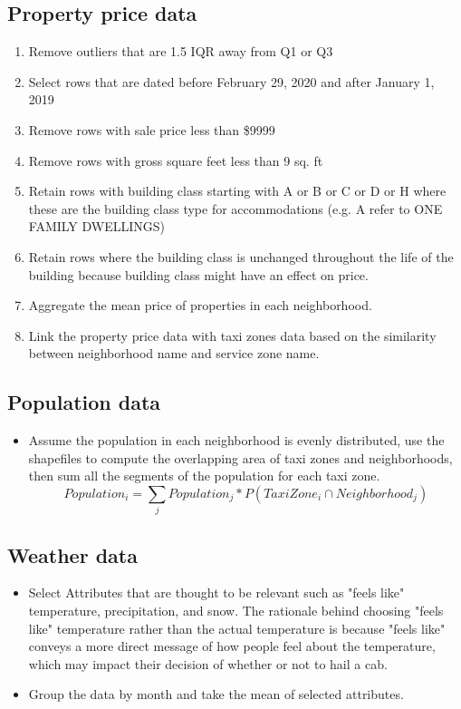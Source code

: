 \documentclass[11pt]{article}
\begin{document}
\subsection{Property price data}
\begin{enumerate} 
    \item Remove outliers that are 1.5 IQR away from Q1 or Q3
    \item Select rows that are dated before February 29, 2020 and after January 1, 2019
    \item Remove rows with sale price less than \$9999
    \item Remove rows with gross square feet less than 9 sq. ft
    \item Retain rows with building class starting with A or B or C or D or H where these are the building class type for accommodations (e.g. A refer to ONE FAMILY DWELLINGS)
    \item Retain rows where the building class is unchanged throughout the life of the building because building class might have an effect on price.
    \item Aggregate the mean price of properties in each neighborhood.
    \item Link the property price data with taxi zones data based on the similarity between neighborhood name and service zone name.
\end{enumerate}
\subsection{Population data}
\begin{itemize}
    \item Assume the population in each neighborhood is evenly distributed, use the shapefiles to compute the overlapping area of taxi zones and neighborhoods, then sum all the segments of the population for each taxi zone. \[ Population_i = \sum_j Population_j * P(TaxiZone_i\cap Neighborhood_j)\]
\end{itemize}
\subsection{Weather data}
\begin{itemize}
    \item Select Attributes that are thought to be relevant such as "feels like" temperature, precipitation, and snow. The rationale behind choosing "feels like" temperature rather than the actual temperature is because "feels like" conveys a more direct message of how people feel about the temperature, which may impact their decision of whether or not to hail a cab.
    \item Group the data by month and take the mean of selected attributes.
\end{itemize}
\end{document}
